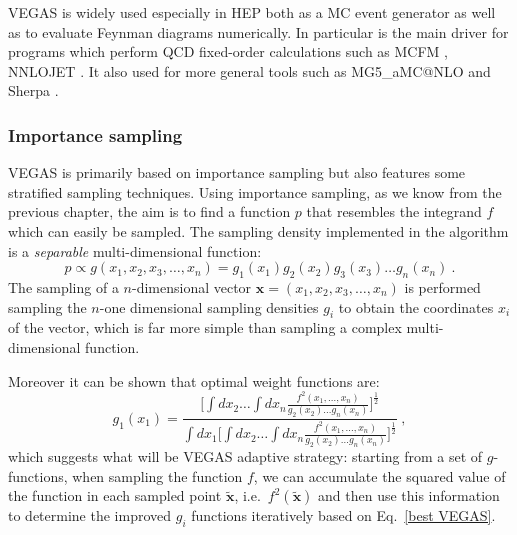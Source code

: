 \documentclass[../main/main.tex]{subfiles}
\begin{document}
VEGAS is widely used especially in HEP both as a MC event generator as well as to evaluate Feynman diagrams numerically.
In particular is the main driver for programs which perform QCD fixed-order calculations such as MCFM \cite{Campbell:2015qma, Campbell:2019dru}, NNLOJET \cite{Gehrmann:2018szu}. It also used for more general tools such as MG5\_aMC@NLO \cite{Alwall:2014hca} and Sherpa \cite{Gleisberg:2008ta}.
 
\subsubsection{Importance sampling}
VEGAS is primarily based on importance sampling but also features some stratified sampling techniques.
Using importance sampling, as we know from the previous chapter, the aim is to find a function $p$  that resembles the integrand $f$ which can easily be sampled. The sampling density implemented in the algorithm is a \emph{separable} multi-dimensional function:
\begin{equation}
	p \propto g(x_1,x_2,x_3,\dots,x_n) = g_1(x_1)g_2(x_2)g_3(x_3)\dots g_n(x_n) \ .
\end{equation}
The sampling of a $n$-dimensional vector $\textbf{x}=(x_1,x_2,x_3,\dots,x_n)$ is performed sampling the $n$-one dimensional sampling densities
$g_i$ to obtain the coordinates $x_i$ of the vector, which is far more simple than sampling a complex multi-dimensional function.

Moreover it can be shown \cite{Lepage:1977sw, Press:1989vk} that optimal weight functions are:
\begin{equation}
	\label{best VEGAS}
	 g_1(x_1) = \frac{\displaystyle \bigg[ \int dx_2 \dots \int dx_n \frac{f^2(x_1,\dots,x_n)}{g_2(x_2)\dots g_n(x_n) }\bigg]^\frac{1}{2}} { \displaystyle
	 	\int dx_1\bigg[ \int dx_2 \dots \int dx_n \frac{f^2(x_1,\dots,x_n)}{g_2(x_2)\dots g_n(x_n) }\bigg]^\frac{1}{2}} \ ,
\end{equation}
which suggests what will be VEGAS adaptive strategy: starting from a set of $g$-functions, when sampling the function $f$,  we can accumulate the
squared value of the function in each sampled point $\tilde{\textbf{x}}$, i.e.\ $f^2(\tilde{\textbf{x}})$  and then use this information 
to determine  the improved  $g_i$  functions iteratively based on Eq.~\ref{best VEGAS}.
\end{document}
